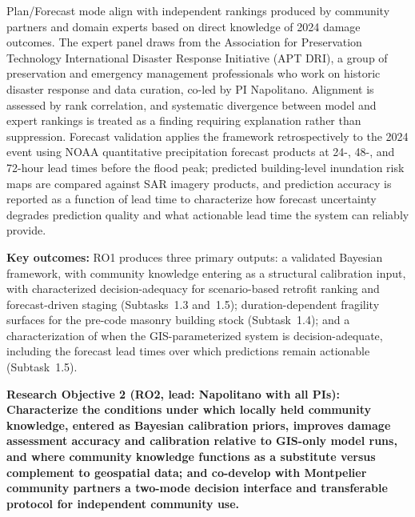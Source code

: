 \documentclass[11pt]{article}
\begin{document}
Plan/Forecast mode align with independent rankings produced by community partners and
domain experts based on direct knowledge of 2024 damage outcomes. The expert panel
draws from the Association for Preservation Technology International Disaster
Response Initiative (APT DRI), a group of preservation and emergency management
professionals who work on historic disaster response and data curation, co-led by
PI Napolitano. Alignment is assessed by rank correlation, and systematic divergence
between model and expert rankings is treated as a finding requiring explanation
rather than suppression.
Forecast validation applies the framework retrospectively to the 2024 event
using NOAA quantitative precipitation forecast products at 24-, 48-, and 72-hour
lead times before the flood peak; predicted building-level inundation risk maps are
compared against SAR imagery products, and prediction accuracy is reported as a function
of lead time to characterize how forecast uncertainty degrades prediction
quality and what actionable lead time the system can reliably provide.

\textbf{Key outcomes:} RO1 produces three primary outputs: a validated Bayesian framework, with community knowledge entering as a structural calibration input, with characterized decision-adequacy for scenario-based retrofit ranking and forecast-driven staging (Subtasks~1.3 and~1.5); duration-dependent fragility surfaces for the pre-code masonry building stock (Subtask~1.4); and a characterization of when the GIS-parameterized system is decision-adequate, including the forecast lead times over which predictions remain actionable (Subtask~1.5).

\vspace{5pt}
\begin{tcolorbox}[colback=mycmykcolor,colframe=black,boxrule=1pt,coltext=black,
  left=1mm,right=1mm,top=1mm,bottom=1mm]
\textbf{Research Objective 2 (RO2, lead: Napolitano with all PIs): Characterize
the conditions under which locally held community knowledge, entered as Bayesian
calibration priors, improves damage assessment accuracy and calibration relative
to GIS-only model runs, and where community knowledge functions as a substitute
versus complement to geospatial data; and co-develop with Montpelier community
partners a two-mode decision interface and transferable protocol for independent
community use.}
\end{tcolorbox}
\end{document}
